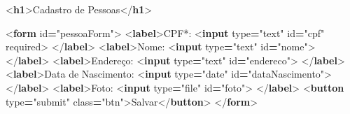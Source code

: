 \documentclass[
]{book}
\newenvironment{Shaded}{\begin{snugshade}}{\end{snugshade}}
\newcommand{\DataTypeTok}[1]{\textcolor[rgb]{0.13,0.29,0.53}{#1}}
\newcommand{\KeywordTok}[1]{\textcolor[rgb]{0.13,0.29,0.53}{\textbf{#1}}}
\newcommand{\NormalTok}[1]{#1}
\newcommand{\OperatorTok}[1]{\textcolor[rgb]{0.81,0.36,0.00}{\textbf{#1}}}
\newcommand{\OtherTok}[1]{\textcolor[rgb]{0.56,0.35,0.01}{#1}}
\newcommand{\StringTok}[1]{\textcolor[rgb]{0.31,0.60,0.02}{#1}}
\begin{document}
\begin{Shaded}
\begin{Highlighting}[]
\DataTypeTok{\textless{}}\KeywordTok{h1}\DataTypeTok{\textgreater{}}\NormalTok{Cadastro de Pessoas}\DataTypeTok{\textless{}/}\KeywordTok{h1}\DataTypeTok{\textgreater{}}

\DataTypeTok{\textless{}}\KeywordTok{form}\OtherTok{ id}\OperatorTok{=}\StringTok{"pessoaForm"}\DataTypeTok{\textgreater{}}
  \DataTypeTok{\textless{}}\KeywordTok{label}\DataTypeTok{\textgreater{}}\NormalTok{CPF*:}
    \DataTypeTok{\textless{}}\KeywordTok{input}\OtherTok{ type}\OperatorTok{=}\StringTok{"text"}\OtherTok{ id}\OperatorTok{=}\StringTok{"cpf"}\OtherTok{ required}\DataTypeTok{\textgreater{}}
  \DataTypeTok{\textless{}/}\KeywordTok{label}\DataTypeTok{\textgreater{}}
  \DataTypeTok{\textless{}}\KeywordTok{label}\DataTypeTok{\textgreater{}}\NormalTok{Nome:}
    \DataTypeTok{\textless{}}\KeywordTok{input}\OtherTok{ type}\OperatorTok{=}\StringTok{"text"}\OtherTok{ id}\OperatorTok{=}\StringTok{"nome"}\DataTypeTok{\textgreater{}}
  \DataTypeTok{\textless{}/}\KeywordTok{label}\DataTypeTok{\textgreater{}}
  \DataTypeTok{\textless{}}\KeywordTok{label}\DataTypeTok{\textgreater{}}\NormalTok{Endereço:}
    \DataTypeTok{\textless{}}\KeywordTok{input}\OtherTok{ type}\OperatorTok{=}\StringTok{"text"}\OtherTok{ id}\OperatorTok{=}\StringTok{"endereco"}\DataTypeTok{\textgreater{}}
  \DataTypeTok{\textless{}/}\KeywordTok{label}\DataTypeTok{\textgreater{}}
  \DataTypeTok{\textless{}}\KeywordTok{label}\DataTypeTok{\textgreater{}}\NormalTok{Data de Nascimento:}
    \DataTypeTok{\textless{}}\KeywordTok{input}\OtherTok{ type}\OperatorTok{=}\StringTok{"date"}\OtherTok{ id}\OperatorTok{=}\StringTok{"dataNascimento"}\DataTypeTok{\textgreater{}}
  \DataTypeTok{\textless{}/}\KeywordTok{label}\DataTypeTok{\textgreater{}}
  \DataTypeTok{\textless{}}\KeywordTok{label}\DataTypeTok{\textgreater{}}\NormalTok{Foto:}
    \DataTypeTok{\textless{}}\KeywordTok{input}\OtherTok{ type}\OperatorTok{=}\StringTok{"file"}\OtherTok{ id}\OperatorTok{=}\StringTok{"foto"}\DataTypeTok{\textgreater{}}
  \DataTypeTok{\textless{}/}\KeywordTok{label}\DataTypeTok{\textgreater{}}
  \DataTypeTok{\textless{}}\KeywordTok{button}\OtherTok{ type}\OperatorTok{=}\StringTok{"submit"}\OtherTok{ class}\OperatorTok{=}\StringTok{"btn"}\DataTypeTok{\textgreater{}}\NormalTok{Salvar}\DataTypeTok{\textless{}/}\KeywordTok{button}\DataTypeTok{\textgreater{}}
\DataTypeTok{\textless{}/}\KeywordTok{form}\DataTypeTok{\textgreater{}}


\end{Highlighting}
\end{Shaded}
\end{document}
